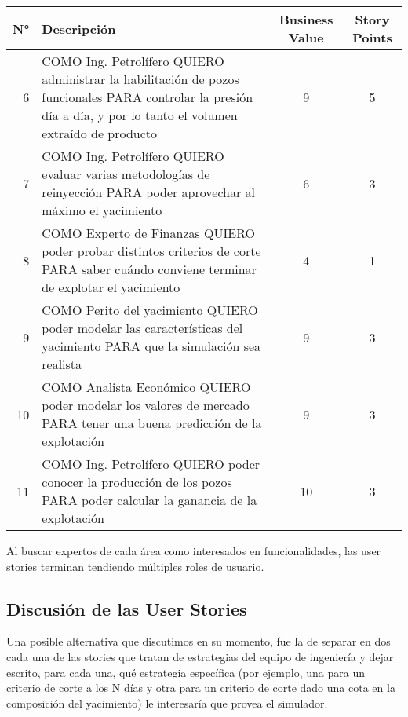 \begin{center}
  \begin{tabular}{| r | p{10cm} | c | c | }
    \hline
    N° & Descripción & Business Value & Story Points\\  \hline

    6 & COMO Ing. Petrolífero QUIERO administrar la habilitación de pozos funcionales PARA controlar 
    la presión día a día, y por lo tanto el volumen extraído de producto & 9 & 5\\ \hline
    
    7 & COMO Ing. Petrolífero QUIERO evaluar varias metodologías de reinyección PARA poder aprovechar 
    al máximo el yacimiento & 6 & 3\\ \hline
    
    8 & COMO Experto de Finanzas QUIERO poder probar distintos criterios de corte PARA saber 
    cuándo conviene terminar de explotar el yacimiento & 4 & 1\\ \hline
    
    9 & COMO Perito del yacimiento QUIERO poder modelar las características del yacimiento PARA 
    que la simulación sea realista & 9 & 3\\ \hline
    
    10 & COMO Analista Económico QUIERO poder modelar los valores de mercado PARA 
    tener una buena predicción de la explotación & 9 & 3\\ \hline
    
    11 & COMO Ing. Petrolífero QUIERO poder conocer la producción de los pozos PARA poder calcular 
    la ganancia de la explotación & 10 & 3\\ \hline
    
  \end{tabular}
\end{center}

Al buscar expertos de cada área como interesados en funcionalidades, las user stories terminan tendiendo múltiples roles de usuario.

\subsection{Discusión de las User Stories}

Una posible alternativa que discutimos en su momento, fue la de separar en dos cada una de las stories que tratan de estrategias del equipo de ingeniería y dejar escrito, para cada una, qué estrategia específica (por ejemplo, una para un criterio de corte a los N días y otra para un criterio de corte dado una cota en la composición del yacimiento) le interesaría que provea el simulador.

